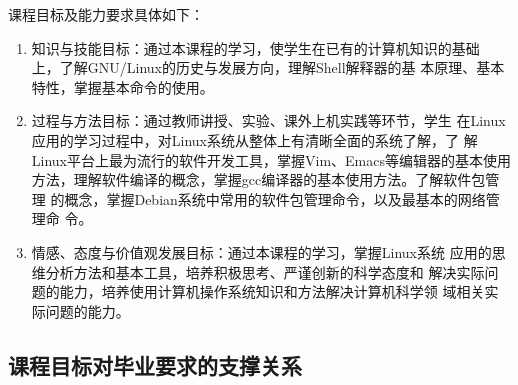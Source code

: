 \documentclass{swfusyllabus}
\begin{document}
课程目标及能力要求具体如下：

\begin{enumerate}
\item 知识与技能目标：通过本课程的学习，使学生在已有的计算机知识的基础
  上，了解GNU/Linux的历史与发展方向，理解Shell解释器的基
  本原理、基本特性，掌握基本命令的使用。
\item 过程与方法目标：通过教师讲授、实验、课外上机实践等环节，学生
  在Linux应用的学习过程中，对Linux系统从整体上有清晰全面的系统了解，了
  解Linux平台上最为流行的软件开发工具，掌握Vim、Emacs等编辑器的基本使用
  方法，理解软件编译的概念，掌握gcc编译器的基本使用方法。了解软件包管理
  的概念，掌握Debian系统中常用的软件包管理命令，以及最基本的网络管理命
  令。
\item 情感、态度与价值观发展目标：通过本课程的学习，掌握Linux系统
  应用的思维分析方法和基本工具，培养积极思考、严谨创新的科学态度和
  解决实际问题的能力，培养使用计算机操作系统知识和方法解决计算机科学领
  域相关实际问题的能力。
\end{enumerate}

\subsection{课程目标对毕业要求的支撑关系}
\end{document}
